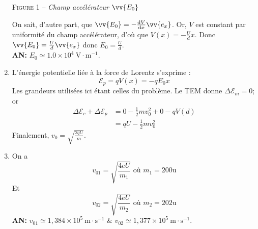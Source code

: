 \documentclass[17pt]{article}
\def\Em{\mathcal{E}_m}
\def\Ec{\mathcal{E}_c}
\def\Ep{\mathcal{E}_p}
\begin{document}
\begin{enumerate}
\begin{center}
			\textsc{Figure 1 – } \textit{Champ accélérateur $\vv{E_0}$}
		\end{center}
		On sait, d'autre part, que $\vv{E_0}=-\frac{\dd V}{\dd x}\vv{e_x}$. Or, $V$ est constant par uniformité du champ accélérateur, d'où que $V(x)=-\frac Udx$. Donc $\vv{E_0}=\frac Ud\vv{e_x}$ donc $E_0=\frac Ud$.\\
		\textbf{AN:} $E_0\simeq 1.0\times10^4\ \text{V}\cdot\text{m}^{-1}$.
		\item L'énergie potentielle liée à la force de Lorentz s'exprime : \[\Ep=qV(x)=-qE_0x\]
		Les grandeurs utilisées ici étant celles du problème. Le TEM donne $\Delta\Em=0$; or 
		\begin{align*}
			\Delta\Ec+\Delta\Ep &= 0-\frac12mv_0^2+0-qV(d)\\
								&= qU-\frac12mv_0^2
		\end{align*}
		Finalement, $\boxed{v_0=\sqrt{\frac{2qU}m}}$.
		\item On a 
		\[v_{01}=\sqrt{\frac{4eU}{m_1}}\text{ où }m_1=200\text{u}\]
		Et 
		\[v_{02}=\sqrt{\frac{4eU}{m_2}}\text{ où }m_2=202\text{u}\]
		\textbf{AN:} $v_{01}\simeq 1,384\times10^5\ \text{m}\cdot\text{s}^{-1}$ \& $v_{02}\simeq  1,377\times10^5\ \text{m}\cdot\text{s}^{-1}$.
	\end{enumerate}
\end{document}
